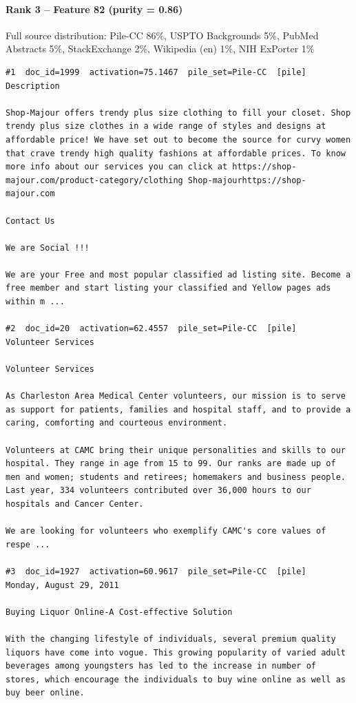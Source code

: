 \paragraph*{Rank 3 -- Feature 82 (purity = 0.86)}

Full source distribution: Pile-CC 86\%, USPTO Backgrounds 5\%, PubMed Abstracts 5\%, StackExchange 2\%, Wikipedia (en) 1\%, NIH ExPorter 1\%

\begin{verbatim}
#1  doc_id=1999  activation=75.1467  pile_set=Pile-CC  [pile]
Description

Shop-Majour offers trendy plus size clothing to fill your closet. Shop trendy plus size clothes in a wide range of styles and designs at affordable price! We have set out to become the source for curvy women that crave trendy high quality fashions at affordable prices. To know more info about our services you can click at https://shop-majour.com/product-category/clothing Shop-majourhttps://shop-majour.com

Contact Us

We are Social !!!

We are your Free and most popular classified ad listing site. Become a free member and start listing your classified and Yellow pages ads within m ...

#2  doc_id=20  activation=62.4557  pile_set=Pile-CC  [pile]
Volunteer Services

Volunteer Services

As Charleston Area Medical Center volunteers, our mission is to serve as support for patients, families and hospital staff, and to provide a caring, comforting and courteous environment.

Volunteers at CAMC bring their unique personalities and skills to our hospital. They range in age from 15 to 99. Our ranks are made up of men and women; students and retirees; homemakers and business people. Last year, 334 volunteers contributed over 36,000 hours to our hospitals and Cancer Center.

We are looking for volunteers who exemplify CAMC's core values of respe ...

#3  doc_id=1927  activation=60.9617  pile_set=Pile-CC  [pile]
Monday, August 29, 2011

Buying Liquor Online-A Cost-effective Solution

With the changing lifestyle of individuals, several premium quality liquors have come into vogue. This growing popularity of varied adult beverages among youngsters has led to the increase in number of stores, which encourage the individuals to buy wine online as well as buy beer online.


\end{verbatim}
